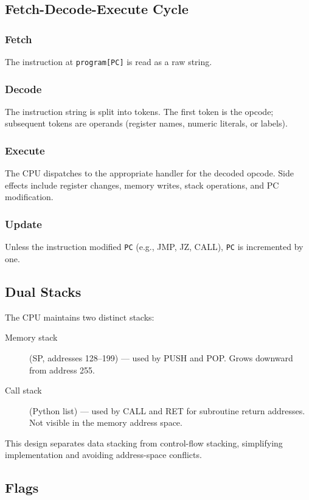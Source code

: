 \documentclass[11pt,a4paper]{article}
\begin{document}
\subsection{Fetch-Decode-Execute Cycle}

\subsubsection{Fetch}
The instruction at \texttt{program[PC]} is read as a raw string.

\subsubsection{Decode}
The instruction string is split into tokens.  The first token is the opcode;
subsequent tokens are operands (register names, numeric literals, or labels).

\subsubsection{Execute}
The CPU dispatches to the appropriate handler for the decoded opcode.  Side
effects include register changes, memory writes, stack operations, and PC
modification.

\subsubsection{Update}
Unless the instruction modified \texttt{PC} (e.g., JMP, JZ, CALL), \texttt{PC}
is incremented by one.

\subsection{Dual Stacks}

The CPU maintains two distinct stacks:

\begin{description}
  \item[Memory stack] (SP, addresses 128--199) --- used by PUSH and POP.
        Grows downward from address 255.
  \item[Call stack] (Python list) --- used by CALL and RET for subroutine
        return addresses.  Not visible in the memory address space.
\end{description}

This design separates data stacking from control-flow stacking, simplifying
implementation and avoiding address-space conflicts.

\subsection{Flags}
\end{document}
